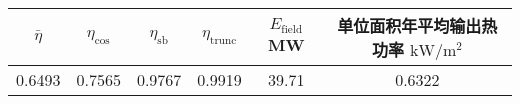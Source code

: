\begin{tabular}{|cccccc|}
\hline
\(\bar \eta\) & \(\eta _{\cos}\) & \(\eta _{\mathrm{s b}}\) & \(\eta _{\mathrm{trunc}}\) & \(E_{\mathrm{field}}\)MW &单位面积年平均输出热功率 \(\mathrm{kW}/\mathrm{m}^{2}\)\\
\hline
0.6493 & 0.7565 & 0.9767 & 0.9919 & 39.71 & 0.6322\\
\hline
\end{tabular}
